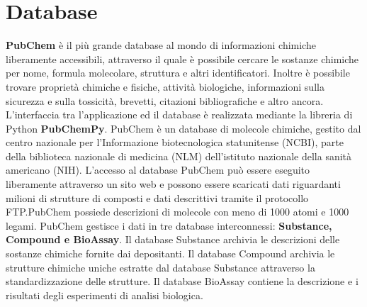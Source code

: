 \section{Database}
\textbf{PubChem} è il più grande database al mondo di informazioni chimiche liberamente accessibili, attraverso il quale è possibile cercare le sostanze chimiche per nome, formula molecolare, struttura e altri identificatori. Inoltre è possibile trovare proprietà chimiche e fisiche, attività biologiche, informazioni sulla sicurezza e sulla tossicità, brevetti, citazioni bibliografiche e altro ancora. L'interfaccia tra l'applicazione ed il database è realizzata mediante la libreria di Python \textbf{PubChemPy}.\newline
PubChem è un database di molecole chimiche, gestito dal centro nazionale per l'Informazione biotecnologica statunitense (NCBI), parte della biblioteca nazionale di medicina (NLM) dell'istituto nazionale della sanità americano (NIH). L'accesso al database PubChem può essere eseguito liberamente attraverso un sito web e possono essere scaricati dati riguardanti milioni di strutture di composti e dati descrittivi tramite il protocollo FTP.PubChem possiede descrizioni di molecole con meno di 1000 atomi e 1000 legami. \newline 
PubChem gestisce i dati in tre database interconnessi: \textbf{Substance, Compound e BioAssay}. Il database Substance archivia le descrizioni delle sostanze chimiche fornite dai depositanti. Il database Compound archivia le strutture chimiche uniche estratte dal database Substance attraverso la standardizzazione delle strutture. Il database BioAssay contiene la descrizione e i risultati degli esperimenti di analisi biologica.

